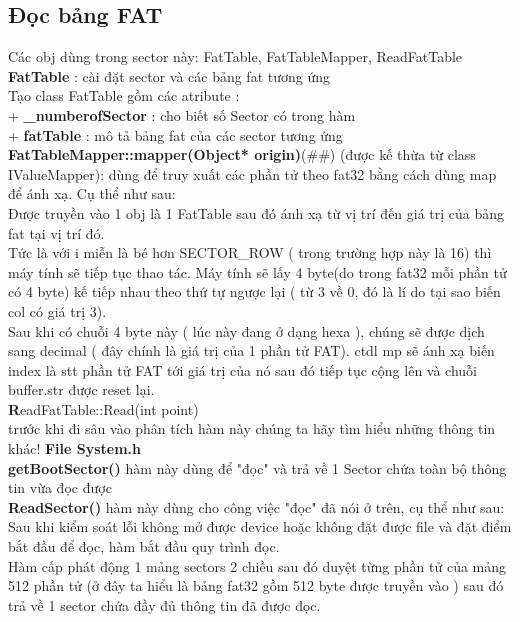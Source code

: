 \subsection{Đọc bảng FAT}
\noindent
Các obj dùng trong sector này: FatTable, FatTableMapper, ReadFatTable\\
\indent
\textbf{FatTable} : cài đặt sector và các bảng fat tương ứng\\
\indent
Tạo class FatTable gồm các atribute :\\
\indent\indent
+ \textbf{\_numberofSector} : cho biết số Sector có trong hàm \\
\indent\indent
+ \textbf{fatTable} : mô tả bảng fat của các sector tương ứng\\
\indent
\textbf{FatTableMapper::mapper(Object* origin)}(\#\#) (được kế thừa từ class IValueMapper): dùng để truy xuất các phần tử theo fat32 bằng cách dùng map để ánh xạ. Cụ thể như sau:\\
\indent
Được truyền vào 1 obj là 1 FatTable sau đó ánh xạ từ vị trí đến giá trị của bảng fat tại vị trí đó. \\
\indent
Tức là với i miễn là bé hơn SECTOR\_ROW ( trong trường hợp này là 16) thì máy tính sẽ tiếp tục thao tác. Máy tính sẽ lấy 4 byte(do trong fat32 mỗi phần tử có 4 byte) kế tiếp nhau theo thứ tự ngược lại ( từ 3 về 0, đó là lí do tại sao biến col có giá trị 3). \\
Sau khi có chuỗi 4 byte này ( lúc này đang ở dạng hexa ), chúng sẽ được dịch sang decimal ( đây chính là giá trị của 1 phần tử FAT). 
ctdl mp sẽ ánh xạ biến index là stt phần tử FAT tới giá trị của nó sau đó tiếp tục cộng lên và chuỗi buffer.str được reset lại.\\
{\textbf ReadFatTable::Read(int point)}\\
trước khi đi sâu vào phân tích hàm này chúng ta hãy tìm hiểu những thông tin khác!
\textbf {File System.h}\\
\textbf {getBootSector()} hàm này dùng để "đọc" và trả về 1 Sector chứa toàn bộ thông tin vừa đọc được\\
\textbf {ReadSector()} hàm này dùng cho công việc "đọc" đã nói ở trên, cụ thể như sau:\\
\indent
Sau khi kiểm soát lỗi không mở được device hoặc không đặt được file và đặt điểm bắt đầu để đọc, hàm bắt đầu quy trình đọc.\\
\indent
Hàm cấp phát động 1 mảng sectors 2 chiều sau đó duyệt từng phần tử của mảng 512 phần tử (ở đây ta hiểu là bảng fat32 gồm 512 byte được truyền vào ) sau đó trả về 1 sector chứa đầy đủ thông tin đã được đọc.\\
